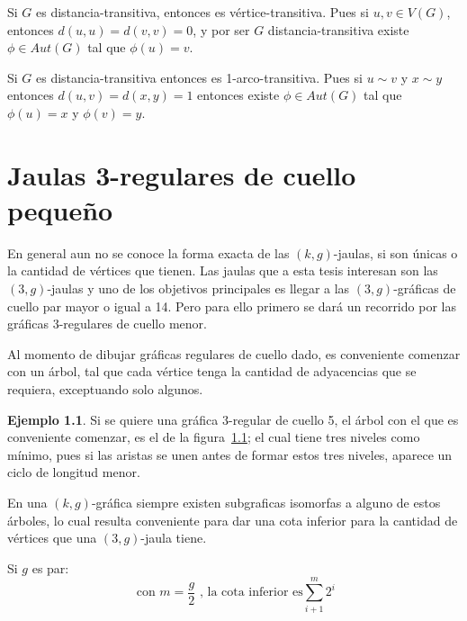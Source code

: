 \documentclass[12pt]{book}
\theoremstyle{definition}
\newtheorem{example}{Ejemplo}
\begin{document}
Si $G$ es distancia-transitiva, entonces es
vértice-transitiva. Pues si $u,v \in V(G)$, entonces
$d(u,u)=d(v,v)=0$, y por ser $G$ distancia-transitiva existe
$\phi\in Aut(G)$ tal que $\phi(u)=v$.

Si $G$ es distancia-transitiva entonces es
1-arco-transitiva. Pues si $u\sim v$ y $x\sim y$ entonces
$d(u,v)=d(x,y)=1$ entonces existe $\phi \in Aut(G)$ tal que
$\phi(u)=x$ y $\phi(v)=y$.

\chapter{Jaulas 3-regulares de cuello pequeño}

En general aun no se conoce la forma exacta de las $(k,g)$-jaulas, si
son únicas o la cantidad de vértices que tienen. Las jaulas que a esta
tesis interesan son las $(3,g)$-jaulas y uno de los objetivos
principales es llegar a las $(3,g)$-gráficas de cuello par mayor o
igual a 14. Pero para ello primero se dará un recorrido por las
gráficas $3$-regulares de cuello menor. 

Al momento de dibujar gráficas regulares de cuello dado, es
conveniente comenzar con un árbol, tal que cada vértice tenga la
cantidad de adyacencias que se requiera, exceptuando solo algunos.

\begin{example}
  Si se quiere una gráfica 3-regular de cuello 5, el árbol con el que
  es conveniente comenzar, es el de la figura~\ref{arbol}; el cual
  tiene tres niveles como mínimo, pues si las aristas se unen antes de
  formar estos tres niveles, aparece un ciclo de longitud menor.

  \begin{figure}[htb]
    \centering
    \caption{} \label{arbol}
  \end{figure}
\end{example}

En una $(k,g)$-gráfica siempre existen subgraficas isomorfas a alguno
de estos árboles, lo cual resulta conveniente para dar una
cota inferior para la cantidad de vértices que una $(3,g)$-jaula
tiene.

Si $g$ es par:
\begin{equation*}
\text{  con } m=\frac{g}{2} \text{ , la cota inferior es} \sum^{m}_{i+1}2^i
\end{equation*}
\end{document}
